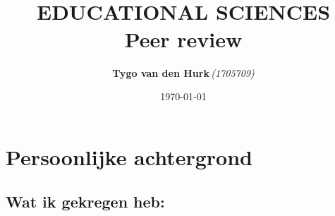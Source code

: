 \documentclass{article}
\title{ 
    \normalsize 
    \textsc{} \\
    [2.0cm]
    \HRule{1.5pt} \\
    \LARGE \textbf{
        \uppercase{
            Educational sciences}
    \HRule{2.0pt} \\ 
    [0.6cm] 
    \LARGE{Peer review} 
    \vspace*{
        10\baselineskip}}
}
\date{\today}
\author{\textbf{Tygo van den Hurk}\,\orcidlink{0009-0003-4182-5076}\textit{(1705709)}}
\begin{document}
    
    
    \maketitle
    \thispagestyle{empty}
    \newpage
    
    
    \renewcommand{\contentsname}{Inhoudsopgave}
    \tableofcontents
    \thispagestyle{empty}
    \newpage


    \section{Persoonlijke achtergrond}
        
        \subsection{Wat ik gekregen heb:}
\end{document}
